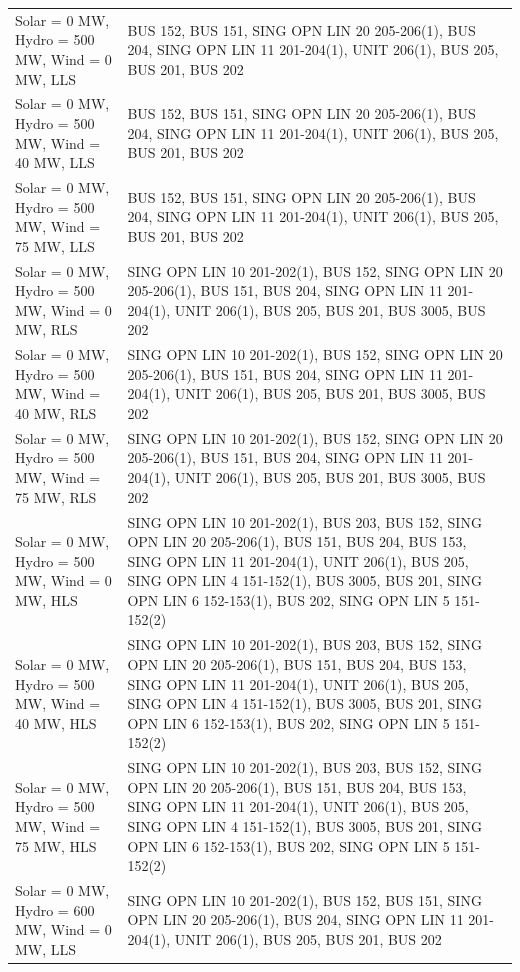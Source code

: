\documentclass[10pt]{report}
\begin{document}
\begin{table}[H]
{\begin{tabular}{lp{17cm}}
Solar = 0 MW, Hydro = 500 MW, Wind = 0 MW, LLS & BUS 152, BUS 151, SING OPN LIN   20 205-206(1), BUS 204, SING OPN LIN   11 201-204(1), UNIT 206(1), BUS 205, BUS 201, BUS 202 \\
Solar = 0 MW, Hydro = 500 MW, Wind = 40 MW, LLS & BUS 152, BUS 151, SING OPN LIN   20 205-206(1), BUS 204, SING OPN LIN   11 201-204(1), UNIT 206(1), BUS 205, BUS 201, BUS 202 \\
Solar = 0 MW, Hydro = 500 MW, Wind = 75 MW, LLS & BUS 152, BUS 151, SING OPN LIN   20 205-206(1), BUS 204, SING OPN LIN   11 201-204(1), UNIT 206(1), BUS 205, BUS 201, BUS 202 \\
Solar = 0 MW, Hydro = 500 MW, Wind = 0 MW, RLS & SING OPN LIN   10 201-202(1), BUS 152, SING OPN LIN   20 205-206(1), BUS 151, BUS 204, SING OPN LIN   11 201-204(1), UNIT 206(1), BUS 205, BUS 201, BUS 3005, BUS 202 \\
Solar = 0 MW, Hydro = 500 MW, Wind = 40 MW, RLS & SING OPN LIN   10 201-202(1), BUS 152, SING OPN LIN   20 205-206(1), BUS 151, BUS 204, SING OPN LIN   11 201-204(1), UNIT 206(1), BUS 205, BUS 201, BUS 3005, BUS 202 \\
Solar = 0 MW, Hydro = 500 MW, Wind = 75 MW, RLS & SING OPN LIN   10 201-202(1), BUS 152, SING OPN LIN   20 205-206(1), BUS 151, BUS 204, SING OPN LIN   11 201-204(1), UNIT 206(1), BUS 205, BUS 201, BUS 3005, BUS 202 \\
Solar = 0 MW, Hydro = 500 MW, Wind = 0 MW, HLS & SING OPN LIN   10 201-202(1), BUS 203, BUS 152, SING OPN LIN   20 205-206(1), BUS 151, BUS 204, BUS 153, SING OPN LIN   11 201-204(1), UNIT 206(1), BUS 205, SING OPN LIN   4 151-152(1), BUS 3005, BUS 201, SING OPN LIN   6 152-153(1), BUS 202, SING OPN LIN   5 151-152(2) \\
Solar = 0 MW, Hydro = 500 MW, Wind = 40 MW, HLS & SING OPN LIN   10 201-202(1), BUS 203, BUS 152, SING OPN LIN   20 205-206(1), BUS 151, BUS 204, BUS 153, SING OPN LIN   11 201-204(1), UNIT 206(1), BUS 205, SING OPN LIN   4 151-152(1), BUS 3005, BUS 201, SING OPN LIN   6 152-153(1), BUS 202, SING OPN LIN   5 151-152(2) \\
Solar = 0 MW, Hydro = 500 MW, Wind = 75 MW, HLS & SING OPN LIN   10 201-202(1), BUS 203, BUS 152, SING OPN LIN   20 205-206(1), BUS 151, BUS 204, BUS 153, SING OPN LIN   11 201-204(1), UNIT 206(1), BUS 205, SING OPN LIN   4 151-152(1), BUS 3005, BUS 201, SING OPN LIN   6 152-153(1), BUS 202, SING OPN LIN   5 151-152(2) \\
Solar = 0 MW, Hydro = 600 MW, Wind = 0 MW, LLS & SING OPN LIN   10 201-202(1), BUS 152, BUS 151, SING OPN LIN   20 205-206(1), BUS 204, SING OPN LIN   11 201-204(1), UNIT 206(1), BUS 205, BUS 201, BUS 202 \\

\end{tabular}}
\end{table}
\end{document}
